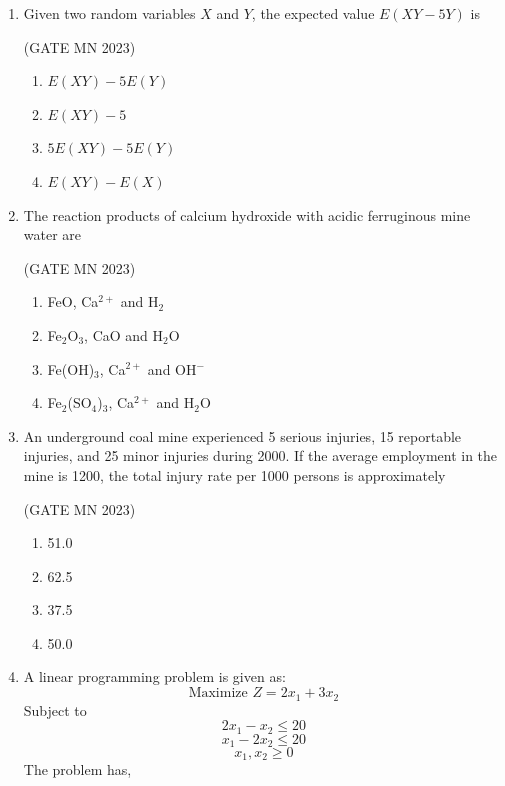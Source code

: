 \documentclass[journal]{IEEEtran}
\begin{document}
\begin{enumerate}
\item Given two random variables $X$ and $Y$, the expected value $E(XY - 5Y)$ is


	\hfill(GATE MN 2023)
\begin{multicols}{4}
\begin{enumerate}
    \item $E(XY) - 5E(Y)$  
    \item $E(XY) - 5$  
    \item $5E(XY) - 5E(Y)$  
    \item $E(XY) - E(X)$  
\end{enumerate}
\end{multicols}

\item The reaction products of calcium hydroxide with acidic ferruginous mine water are


	\hfill(GATE MN 2023)
\begin{multicols}{2}
\begin{enumerate}
    \item FeO, Ca$^{2+}$ and H$_2$  
    \item Fe$_2$O$_3$, CaO and H$_2$O  
    \item Fe(OH)$_3$, Ca$^{2+}$ and OH$^-$  
    \item Fe$_2$(SO$_4$)$_3$, Ca$^{2+}$ and H$_2$O  
\end{enumerate}
\end{multicols}

\item An underground coal mine experienced 5 serious injuries, 15 reportable injuries, and 25 minor injuries during 2000.  
If the average employment in the mine is 1200, the total injury rate per 1000 persons is approximately


\hfill(GATE MN 2023)
\begin{multicols}{4}
\begin{enumerate}
    \item 51.0  
    \item 62.5  
    \item 37.5  
    \item 50.0  
\end{enumerate}
\end{multicols}

\item A linear programming problem is given as:  
\[
\text{Maximize } Z = 2x_1 + 3x_2
\]  
Subject to  
\[
2x_1 - x_2 \leq 20
\]  
\[
x_1 - 2x_2 \leq 20
\]  
\[
x_1, x_2 \geq 0
\]  
The problem has,  


\end{enumerate}
\end{document}
